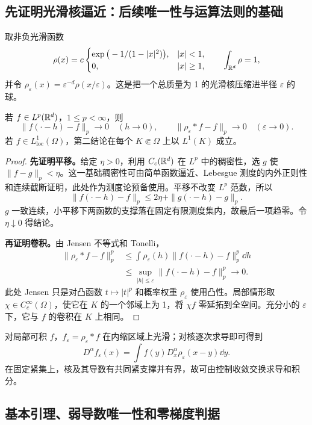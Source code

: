 \subsection{先证明光滑核逼近：后续唯一性与运算法则的基础}

取非负光滑函数
\[
 \rho(x)=c\begin{cases}\exp\big(-1/(1-|x|^2)\big),&|x|<1,\\0,&|x|\ge1,\end{cases}
 \qquad\int_{\mathbb R^d}\rho=1,
\]
并令 $\rho_\varepsilon(x)=\varepsilon^{-d}\rho(x/\varepsilon)$。这是把一个总质量为 1 的光滑核压缩进半径 $\varepsilon$ 的球。

\begin{lemma}[平移连续与近似恒等]\label{lem:weak-approx-identity}
若 $f\in L^p(\mathbb R^d)$，$1\le p<\infty$，则
\[
 \|f(\cdot-h)-f\|_p\to0\quad(h\to0),\qquad
 \|\rho_\varepsilon*f-f\|_p\to0\quad(\varepsilon\to0).
\]
若 $f\in L^1_{\mathrm{loc}}(\Omega)$，第二结论在每个 $K\Subset\Omega$ 上以 $L^1(K)$ 成立。
\end{lemma}
\begin{proof}
\textbf{先证明平移。}给定 $\eta>0$，利用 $C_c(\mathbb R^d)$ 在 $L^p$ 中的稠密性，选 $g$ 使 $\|f-g\|_p<\eta$。这一基础稠密性可由简单函数逼近、Lebesgue 测度的内外正则性和连续截断证明，此处作为测度论预备使用。平移不改变 $L^p$ 范数，所以
\[
 \|f(\cdot-h)-f\|_p\le2\eta+\|g(\cdot-h)-g\|_p.
\]
$g$ 一致连续，小平移下两函数的支撑落在固定有限测度集内，故最后一项趋零。令 $\eta\downarrow0$ 得结论。

\textbf{再证明卷积。}由 Jensen 不等式和 Tonelli，
\begin{align*}
 \|\rho_\varepsilon*f-f\|_p^p
 &\le\int\rho_\varepsilon(h)
             \|f(\cdot-h)-f\|_p^p\dd h\\
 &\le\sup_{|h|\le\varepsilon}\|f(\cdot-h)-f\|_p^p\longrightarrow0.
\end{align*}
此处 Jensen 只是对凸函数 $t\mapsto|t|^p$ 和概率权重 $\rho_\varepsilon$ 使用凸性。局部情形取 $\chi\in C_c^\infty(\Omega)$，使它在 $K$ 的一个邻域上为 1，将 $\chi f$ 零延拓到全空间。充分小的 $\varepsilon$ 下，它与 $f$ 的卷积在 $K$ 上相同。
\end{proof}

对局部可积 $f$，$f_\varepsilon=\rho_\varepsilon*f$ 在内缩区域上光滑；对核逐次求导即可得到
\[
 D^\alpha f_\varepsilon(x)=\int f(y)D_x^\alpha\rho_\varepsilon(x-y)\dd y.
\]
在固定紧集上，核及其导数有共同紧支撑并有界，故可由控制收敛交换求导和积分。

\subsection{基本引理、弱导数唯一性和零梯度判据}

